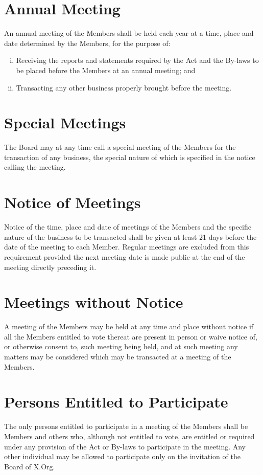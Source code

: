 \documentclass[10pt, english]{xorgdocs}
\begin{document}

\section{Annual Meeting}
An annual meeting of the Members shall be held each year at a time, place and
date determined by the Members, for the purpose of:

\begin{enumerate}[(i)\hspace{.2cm}]
	\item Receiving the reports and statements required by the Act and the
	By-laws to be placed before the Members at an annual meeting; and

	\item Transacting any other business properly brought before the
	meeting.
\end{enumerate}


\section{Special Meetings}
The Board may at any time call a special meeting of the Members for
the transaction of any business, the special nature of which is specified in
the notice calling the meeting.

\section{Notice of Meetings}
Notice of the time, place and date of meetings of the Members and the specific
nature of the business to be transacted shall be given at least 21 days before
the date of the meeting to each Member. Regular meetings are excluded from this
requirement provided the next meeting date is made public at the end of the
meeting directly preceding it.

\section{Meetings without Notice}
A meeting of the Members may be held at any time and place without notice if all
the Members entitled to vote thereat are present in person or waive notice of,
or otherwise consent to, such meeting being held, and at such meeting any
matters may be considered which may be transacted at a meeting of the Members.

\section{Persons Entitled to Participate}
The only persons entitled to participate in a meeting of the Members shall be
Members and others who, although not entitled to vote, are entitled or required
under any provision of the Act or By-laws to participate in the meeting. Any
other individual may be allowed to participate only on the invitation of the
Board of X.Org.
\end{document}
